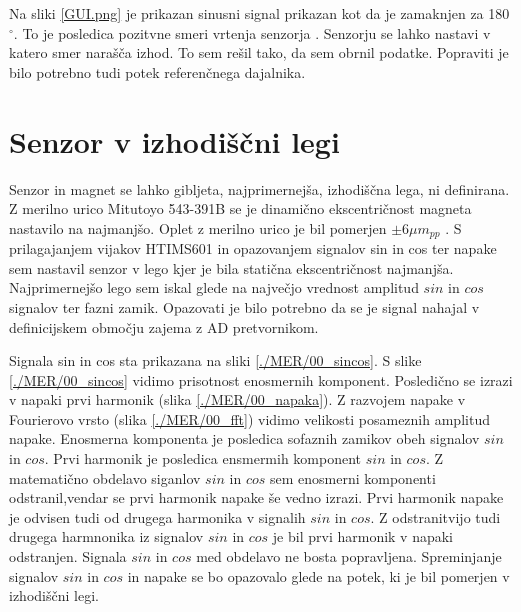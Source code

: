 Na sliki  \ref{GUI.png} je prikazan sinusni signal prikazan kot da je zamaknjen za 180$\mathrm{^\circ}$. To je posledica pozitvne smeri vrtenja senzorja \cite{RM44}. Senzorju se lahko nastavi v katero smer narašča izhod. To sem rešil tako, da sem obrnil podatke. Popraviti je bilo potrebno tudi potek referenčnega dajalnika.
\section{Senzor v izhodiščni legi}
Senzor in magnet se lahko gibljeta, najprimernejša, izhodiščna lega, ni definirana. Z merilno urico Mitutoyo 543-391B se je dinamično ekscentričnost magneta nastavilo na najmanjšo. Oplet z merilno urico je bil pomerjen $\pm 6 \mu m_{pp}$ .
S prilagajanjem vijakov HTIMS601 in opazovanjem signalov sin in cos ter napake sem nastavil senzor v lego kjer je bila statična ekscentričnost najmanjša. Najprimernejšo lego sem iskal glede na največjo vrednost amplitud  $sin$ in $cos$ signalov ter fazni zamik. Opazovati je bilo potrebno  da se je signal nahajal v definicijskem območju zajema z AD pretvornikom.

Signala sin in cos sta prikazana na sliki \ref{./MER/00_sincos}.
S slike \ref{./MER/00_sincos} vidimo prisotnost enosmernih komponent. Posledično se izrazi v napaki prvi harmonik (slika \ref{./MER/00_napaka}).
Z razvojem napake v Fourierovo vrsto (slika \ref{./MER/00_fft}) vidimo velikosti posameznih amplitud napake. 
Enosmerna komponenta je posledica sofaznih zamikov obeh signalov $sin$ in $cos$. 
Prvi harmonik je posledica ensmermih komponent $sin$ in $cos$. Z matematično obdelavo siganlov $sin$ in $cos$ sem enosmerni komponenti odstranil,vendar se prvi harmonik napake še vedno izrazi. Prvi harmonik napake je odvisen tudi od drugega harmonika v signalih $sin$ in $cos$.
Z odstranitvijo tudi drugega harmnonika iz signalov $sin$ in $cos$ je bil  prvi harmonik v napaki odstranjen.
Signala  $sin$ in $cos$ med obdelavo ne bosta popravljena. Spreminjanje signalov  $sin$ in $cos$ in napake se bo opazovalo glede na potek, ki je bil pomerjen v izhodiščni legi.

